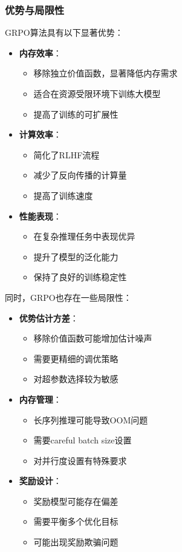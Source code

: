 \documentclass[a4paper, 12pt]{article}
\begin{document}
\subsubsection{优势与局限性}
GRPO算法具有以下显著优势：
\begin{itemize}
    \item \textbf{内存效率}：
        \begin{itemize}
            \item 移除独立价值函数，显著降低内存需求
            \item 适合在资源受限环境下训练大模型
            \item 提高了训练的可扩展性
        \end{itemize}
    \item \textbf{计算效率}：
        \begin{itemize}
            \item 简化了RLHF流程
            \item 减少了反向传播的计算量
            \item 提高了训练速度
        \end{itemize}
    \item \textbf{性能表现}：
        \begin{itemize}
            \item 在复杂推理任务中表现优异
            \item 提升了模型的泛化能力
            \item 保持了良好的训练稳定性
        \end{itemize}
\end{itemize}

同时，GRPO也存在一些局限性：
\begin{itemize}
    \item \textbf{优势估计方差}：
        \begin{itemize}
            \item 移除价值函数可能增加估计噪声
            \item 需要更精细的调优策略
            \item 对超参数选择较为敏感
        \end{itemize}
    \item \textbf{内存管理}：
        \begin{itemize}
            \item 长序列推理可能导致OOM问题
            \item 需要careful batch size设置
            \item 对并行度设置有特殊要求
        \end{itemize}
    \item \textbf{奖励设计}：
        \begin{itemize}
            \item 奖励模型可能存在偏差
            \item 需要平衡多个优化目标
            \item 可能出现奖励欺骗问题
        \end{itemize}
\end{itemize}
\end{document}
